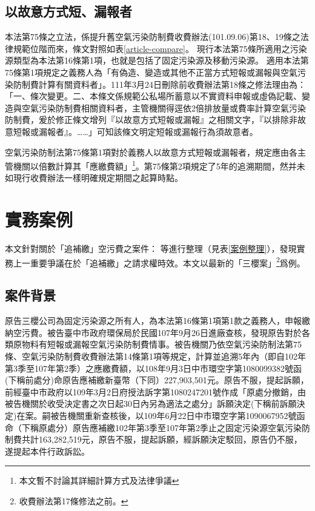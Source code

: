 \documentclass[11pt,a4paper]{article}
\begin{document}
\subsection{以故意方式短、漏報者}

本法第75條之立法，係提升舊空氣污染防制費收費辦法(101.09.06)第18、19條之法律規範位階而來，條文對照如表\ref{article-compare}。
現行本法第75條所適用之污染源類型為本法第16條第1項，也就是包括了固定污染源及移動污染源。
適用本法第75條第1項規定之義務人為「有偽造、變造或其他不正當方式短報或漏報與空氣污染防制費計算有關資料者」。111年3月24日刪除前收費辦法第18條之修法理由為：「一、條次變更。二、本條文係規範公私場所蓄意以不實資料申報或虛偽記載、變造與空氣污染防制費相關資料者，主管機關得逕依2倍排放量或費率計算空氣污染防制費，爰於修正條文增列『以故意方式短報或漏報』之相關文字，『以排除非故意短報或漏報者』。……」可知該條文明定短報或漏報行為須故意者。


空氣污染防制法第75條第1項對於義務人以故意方式短報或漏報者，規定應由各主管機關以倍數計算其「應繳費額」\footnote{本文暫不討論其詳細計算方式及法律爭議}。第75條第2項規定了5年的追溯期間，然并未如現行收費辦法一樣明確規定期間之起算時點。








\section{實務案例}



本文針對關於「追補繳」空污費之案件：
等進行整理（見表\ref{案例整理}），發現實務上一重要爭議在於「追補繳」之請求權時效。本文以最新的「三櫻案」\footnote{收費辦法第17條修法之前。}爲例。



\subsection{案件背景}

原告三櫻公司為固定污染源之所有人，為本法第16條第1項第1款之義務人，申報繳納空污費。被告臺中市政府環保局於民國107年9月26日進廠查核，發現原告對於各類原物料有短報或漏報空氣污染防制費情事。被告機關乃依空氣污染防制法第75條、空氣污染防制費收費辦法第14條第1項等規定，計算並追溯5年內（即自102年第3季至107年第2季）之應繳費額，以108年9月3日中市環空字第1080099382號函(下稱前處分)命原告應補繳新臺幣（下同）227,903,501元。原告不服，提起訴願，前經臺中市政府以109年3月2日府授法訴字第1080247201號作成「原處分撤銷，由被告機關於收受決定書之次日起30日內另為適法之處分」訴願決定(下稱前訴願決定)在案。嗣被告機關重新查核後，以109年6月22日中市環空字第1090067952號函命（下稱原處分）原告應補繳102年第3季至107年第2季止之固定污染源空氣污染防制費共計163,282,519元，原告不服，提起訴願，經訴願決定駁回，原告仍不服，遂提起本件行政訴訟。
\end{document}
